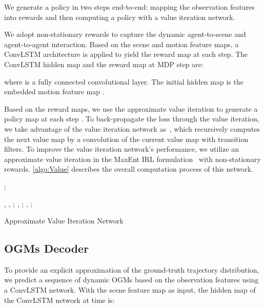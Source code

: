 \documentclass[10pt,twocolumn,letterpaper]{article}
\begin{document}
We generate a policy in two steps end-to-end: mapping the observation features into rewards and then computing a policy with a value iteration network. 

We adopt non-stationary rewards to capture the dynamic agent-to-scene and agent-to-agent interaction. Based on the scene and motion feature maps, a ConvLSTM architecture is applied to yield the reward map at each step. The ConvLSTM hidden map and the reward map at MDP step  are:

where  is a fully connected convolutional layer. The initial hidden map  is the embedded motion feature map . 

Based on the reward maps, we use the approximate value iteration to generate a policy map  at each step . To back-propagate the loss through the value iteration, we take advantage of the value iteration network as~\cite{2016Value,rehder2018pedestrian, pflueger2019rover}, which recursively computes the next value map by a convolution of the current value map with transition filters. To improve the value iteration network's performance, we utilize an approximate value iteration in the MaxEnt IRL formulation~\cite{ziebart2008maximum,wulfmeier2017large} with non-stationary rewards. \cref{algo:Value} describes the overall computation process of this network.

\setlength{\textfloatsep}{0.1cm}
\begin{algorithm}[t]
	\begin{algorithmic}[1]
		\Require  
		
		\Ensure  
	
		\State ;
		
		\For{}

		\State , 		 , ;
		\State , ;
		\State , ;
		\EndFor
	\end{algorithmic}
	\caption{Approximate Value Iteration Network}
	\label{algo:Value} 
\end{algorithm}
\setlength{\floatsep}{0.1cm}




\subsection{OGMs Decoder}

To provide an explicit approximation of the ground-truth trajectory distribution, we predict a sequence of dynamic OGMs based on the observation features using a ConvLSTM network. With the scene feature map as input, the hidden map of the ConvLSTM network at time  is:
\end{document}
